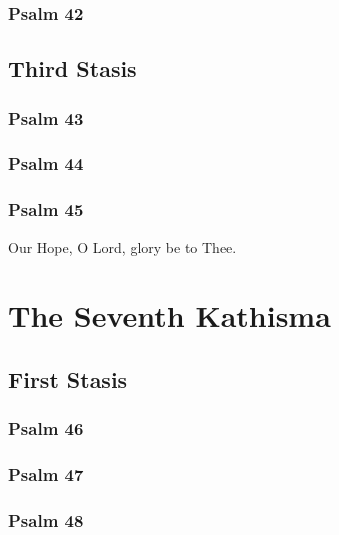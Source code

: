 \documentclass[12pt]{book}
\newcommand{\kathismabreak}{
  \medskip
  \begin{center}
  \begin{footnotesize}
  

  

  

  
  \end{footnotesize}
  \end{center}
  \smallbreak
}
\newcommand{\kathismaend}{
  \medskip
  \begin{center}
  \begin{footnotesize}
  

  

  Our Hope, O Lord, glory be to Thee.
  \end{footnotesize}
  \end{center}
  \smallbreak
}
\begin{document}
\subsubsection{Psalm 42}


\pagebreak %
\kathismabreak

\subsection{Third Stasis}

\subsubsection{Psalm 43}


\subsubsection{Psalm 44}


\subsubsection{Psalm 45}


\kathismaend

\section{The Seventh Kathisma}

\subsection{First Stasis}

\subsubsection{Psalm 46}


\subsubsection{Psalm 47}


\pagebreak %
\subsubsection{Psalm 48}

\end{document}
